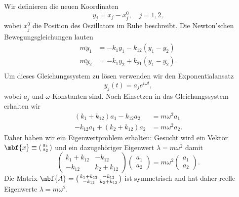 \begin{beispiel}


  \figbox
  Wir definieren die neuen Koordinaten 
  \begin{equation}
    y_j = x_j-x_j^{0},\quad j = 1,2,
  \end{equation}
  wobei $x_j^{0}$ die Position des Oszillators im Ruhe beschreibt. Die Newton'schen Bewegungsgleichungen lauten
  \begin{equation}
    \begin{split}
      m\ddot{y}_1 &= -k_1 y_1 - k_{12} (y_1-y_2) \\
      m\ddot{y}_2 &= -k_1 y_2 + k_{21} (y_1-y_2). \\
    \end{split}
  \end{equation}
  Um dieses Gleichungssystem zu lösen verwenden wir den Exponentialansatz
  \begin{equation}
    y_j(t) = a_j e^{i\omega t},
  \end{equation}
  wobei $a_j$ und $\omega$ Konstanten sind. Nach Einsetzen in das Gleichungssystem erhalten wir
  \begin{equation}
    \begin{split}
      (k_1+k_{12})a_1 - k_{12} a_2 &= m\omega^2 a_1 \\ 
      -k_{12}a_1 + (k_2+k_{12})a_2 &= m\omega^2a_2.
    \end{split}
  \end{equation}
  Daher haben wir ein Eigenwertproblem erhalten: Gesucht wird ein Vektor $\mbf{x} \equiv \left( \begin{smallmatrix}
  a_1 \\ a_2
  \end{smallmatrix} \right)$ und ein dazugehöriger Eigenwert $\lambda = m\omega^2$ damit
  \begin{equation}
    \begin{pmatrix}
      k_1 + k_{12} & -k_{12} \\ -k_{12} & k_2+k_{12}
    \end{pmatrix} \begin{pmatrix}
      a_1 \\ a_2
    \end{pmatrix} = m\omega^2 \begin{pmatrix}
      a_1 \\ a_2
    \end{pmatrix}.
    \end{equation}
    Die Matrix $\mbf{A} =  \left(\begin{smallmatrix}
      k_1 + k_{12} & -k_{12} \\ -k_{12} & k_2+k_{12}
    \end{smallmatrix}\right)$ ist symmetrisch and hat daher reelle Eigenwerte $\lambda = m\omega^2$.


\end{beispiel}
